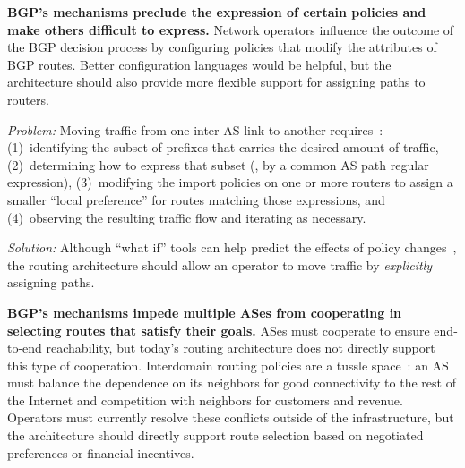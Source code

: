 {\bf BGP's mechanisms preclude the expression of certain policies
and make others difficult to express.}  Network operators influence the
outcome of the BGP decision process by configuring policies that modify
the attributes of BGP routes.  Better configuration languages would be
helpful, but the architecture should also provide more flexible support
for assigning paths to routers.  

\vspace{0.05in}
\noindent
{\em Problem:} 
Moving
traffic from one inter-AS link to another requires~\cite{Feamster2003e}:
(1)~identifying the subset of prefixes that carries the desired amount of
traffic, (2)~determining how to express that subset (\eg, by a common
AS path regular expression), (3)~modifying the import policies on one or
more routers to assign a smaller ``local preference'' for routes
matching those expressions, and (4)~observing the resulting traffic flow
and iterating as necessary.  

\vspace{0.05in}
\noindent
{\em Solution:} 
Although ``what if'' tools can help predict
the effects of policy changes~\cite{Feamster2004}, the routing architecture
should allow an operator to move traffic by {\em explicitly} assigning paths.


{\bf BGP's mechanisms impede multiple ASes from cooperating in
selecting routes that satisfy their goals.}  ASes must cooperate to
ensure end-to-end reachability, but today's routing architecture does
not directly support this type of cooperation.  Interdomain routing
policies are a tussle space~\cite{clark2002}: an AS must balance the
dependence on its neighbors for good connectivity to the rest of the
Internet and competition with neighbors for customers and revenue.
Operators must currently resolve these conflicts outside of the
infrastructure, but
the architecture should directly support route
selection based on negotiated preferences or financial incentives.

